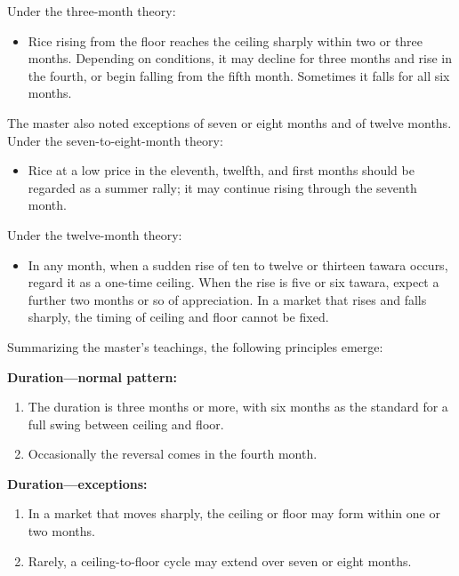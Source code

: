 Under the three-month theory:

\begin{itemize}[nosep]
\item Rice rising from the floor reaches the ceiling sharply within two
  or three months. Depending on conditions, it may decline for
  three months and rise in the fourth, or begin falling from the
  fifth month. Sometimes it falls for all six months.
\end{itemize}

The master also noted exceptions of seven or eight months and of
twelve months. Under the seven-to-eight-month theory:

\begin{itemize}[nosep]
\item Rice at a low price in the eleventh, twelfth, and first months
  should be regarded as a summer rally; it may continue rising
  through the seventh month.
\end{itemize}

Under the twelve-month theory:

\begin{itemize}[nosep]
\item In any month, when a sudden rise of ten to twelve or thirteen
  tawara occurs, regard it as a one-time ceiling. When the rise is
  five or six tawara, expect a further two months or so of
  appreciation. In a market that rises and falls sharply, the timing
  of ceiling and floor cannot be fixed.
\end{itemize}

Summarizing the master's teachings, the following principles emerge:

\textbf{Duration---normal pattern:}

\begin{enumerate}[nosep]
\item The duration is three months or more, with six months as the
  standard for a full swing between ceiling and floor.
\item Occasionally the reversal comes in the fourth month.
\end{enumerate}

\textbf{Duration---exceptions:}

\begin{enumerate}[nosep]
\item In a market that moves sharply, the ceiling or floor may form
  within one or two months.
\item Rarely, a ceiling-to-floor cycle may extend over seven or eight
  months.
\end{enumerate}

